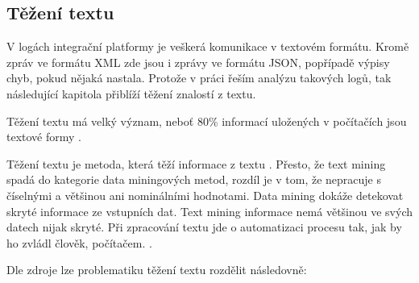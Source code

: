 \documentclass[thesis=M,czech]{FITthesis}[2012/10/20]
\begin{document}
	\subsection{Těžení textu}
		V logách integrační platformy je veškerá komunikace v textovém formátu. Kromě zpráv ve formátu XML zde jsou i zprávy ve formátu JSON, popřípadě výpisy chyb, pokud nějaká nastala. Protože v práci řeším analýzu takových logů, tak následující kapitola přiblíží těžení znalostí z textu. 
		
		Těžení textu má velký význam, neboť 80\% informací uložených v počítačích jsou textové formy \cite{IRWebTechniques}.
		
		Těžení textu je metoda, která těží informace z textu \cite{WittenTextMining}. Přesto, že text mining spadá do kategorie data miningových metod, rozdíl je v tom, že nepracuje s číselnými a většinou ani nominálními hodnotami. Data mining dokáže detekovat skryté informace ze vstupních dat. Text mining informace nemá většinou ve svých datech nijak skryté. Při zpracování textu jde o automatizaci procesu tak, jak by ho zvládl člověk, počítačem. \cite{WittenTextMining}.
		
		Dle zdroje \cite{textAlg} lze problematiku těžení textu rozdělit následovně:
		
\end{document}
